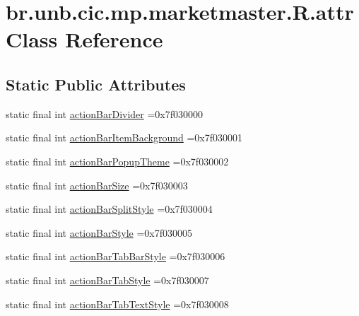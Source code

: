 \hypertarget{classbr_1_1unb_1_1cic_1_1mp_1_1marketmaster_1_1R_1_1attr}{}\section{br.\+unb.\+cic.\+mp.\+marketmaster.\+R.\+attr Class Reference}
\label{classbr_1_1unb_1_1cic_1_1mp_1_1marketmaster_1_1R_1_1attr}
\subsection*{Static Public Attributes}
\begin{DoxyCompactItemize}
\item 
static final int \mbox{\hyperlink{classbr_1_1unb_1_1cic_1_1mp_1_1marketmaster_1_1R_1_1attr_a360c52778a66bcc3ecb4746f567b7b0e}{action\+Bar\+Divider}} =0x7f030000
\item 
static final int \mbox{\hyperlink{classbr_1_1unb_1_1cic_1_1mp_1_1marketmaster_1_1R_1_1attr_a4fbe5768f945353e5eb600b38512f417}{action\+Bar\+Item\+Background}} =0x7f030001
\item 
static final int \mbox{\hyperlink{classbr_1_1unb_1_1cic_1_1mp_1_1marketmaster_1_1R_1_1attr_a5dc9dcf0e3c3c2dae16c53b127669fc3}{action\+Bar\+Popup\+Theme}} =0x7f030002
\item 
static final int \mbox{\hyperlink{classbr_1_1unb_1_1cic_1_1mp_1_1marketmaster_1_1R_1_1attr_a3771bc7111c83a9aff1cb244722ea5bb}{action\+Bar\+Size}} =0x7f030003
\item 
static final int \mbox{\hyperlink{classbr_1_1unb_1_1cic_1_1mp_1_1marketmaster_1_1R_1_1attr_ab3c48d17585b3051f0250b02dd522bb3}{action\+Bar\+Split\+Style}} =0x7f030004
\item 
static final int \mbox{\hyperlink{classbr_1_1unb_1_1cic_1_1mp_1_1marketmaster_1_1R_1_1attr_ab7bdeff81f3e62c2c34ba172cef6ef9e}{action\+Bar\+Style}} =0x7f030005
\item 
static final int \mbox{\hyperlink{classbr_1_1unb_1_1cic_1_1mp_1_1marketmaster_1_1R_1_1attr_a03c075a99608f676f8cae2c9d810d969}{action\+Bar\+Tab\+Bar\+Style}} =0x7f030006
\item 
static final int \mbox{\hyperlink{classbr_1_1unb_1_1cic_1_1mp_1_1marketmaster_1_1R_1_1attr_a3b40e421a07247fa5fe6320090923bc7}{action\+Bar\+Tab\+Style}} =0x7f030007
\item 
static final int \mbox{\hyperlink{classbr_1_1unb_1_1cic_1_1mp_1_1marketmaster_1_1R_1_1attr_a3d1cf28df595c465ba919b48229dd779}{action\+Bar\+Tab\+Text\+Style}} =0x7f030008

\end{DoxyCompactItemize}
